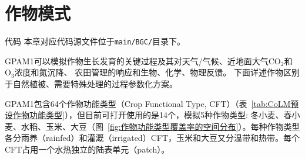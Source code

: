 \chapter{作物模式}
\begin{mymdframed}{代码}
本章对应代码源文件位于\texttt{main/BGC/}目录下。
\end{mymdframed}

GPAM1可以模拟作物生长发育的关键过程及其对天气/气候、近地面大气$\mathrm{CO_2}$和$\mathrm{O_3}$浓度和氮沉降、
农田管理的响应和生物、化学、物理反馈。
下面详述作物区别于自然植被、需要特殊处理的过程参数化方案。

GPAM1包含64个作物功能类型（Crop Functional Type, CFT）（表~\ref{tab:CoLM预设作物功能类型}），但目前可打开使用的是14个，模拟5种作物类型: 冬小麦、春小麦、水稻、玉米、大豆（图~\ref{fig:作物功能类型覆盖率的空间分布}）。每种作物类型各分雨养（rainfed）和灌溉（irrigated）CFT，玉米和大豆又分温带和热带。每个CFT占用一个水热独立的陆表单元（patch）。
